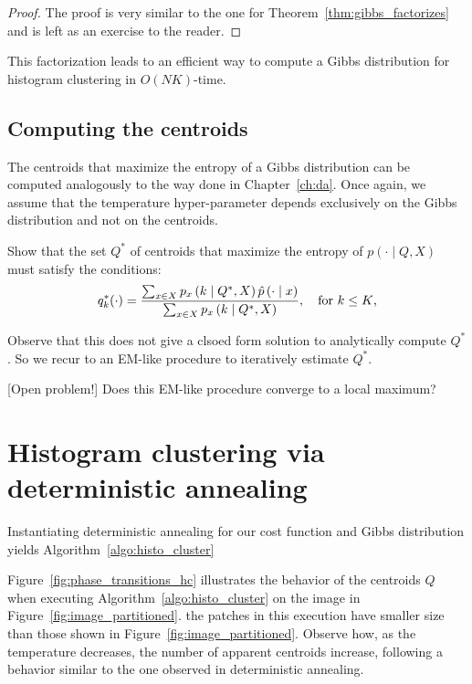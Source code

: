 \begin{proof}
The proof is very similar to the one for Theorem~\ref{thm:gibbs_factorizes} and is left as an exercise to the reader.
\end{proof}

This factorization leads to an efficient way to compute a Gibbs distribution for histogram clustering in $O(NK)$-time.

\subsection{Computing the centroids}

The centroids that maximize the entropy of a Gibbs distribution can be computed analogously to the way done in Chapter~\ref{ch:da}. Once again, we assume that the temperature hyper-parameter depends exclusively on the Gibbs distribution and not on the centroids.

\begin{exercise}
Show that the set $Q^*$ of centroids that maximize the entropy of $p(\cdot \mid Q, X)$ must satisfy the conditions:
%
\begin{equation}
q^*_k(\cdot) = \frac{\sum_{x \in X}p_{x} \left(k\mid Q^*, X\right)\hat{p}\left(\cdot \mid x\right)}{\sum_{x \in X} p_{x} \left(k\mid Q^*, X\right)}, \quad \text{for $k \leq K$,}
\end{equation}
%
\end{exercise}

Observe that this does not give a clsoed form solution to analytically compute $Q^*$. So we recur to an EM-like procedure to iteratively estimate $Q^*$.

\begin{exercise}{[Open problem!]}
Does this EM-like procedure converge to a local maximum?
\end{exercise}

\section{Histogram clustering via deterministic annealing}

Instantiating deterministic annealing for our cost function and Gibbs distribution yields Algorithm~\ref{algo:histo_cluster}

Figure~\ref{fig:phase_transitions_hc} illustrates the behavior of the centroids $Q$ when executing Algorithm~\ref{algo:histo_cluster} on the image in Figure~\ref{fig:image_partitioned}. the patches in this execution have smaller size than those shown in Figure~\ref{fig:image_partitioned}. Observe how, as the temperature decreases, the number of apparent centroids increase, following a behavior similar to the one observed in deterministic annealing.

